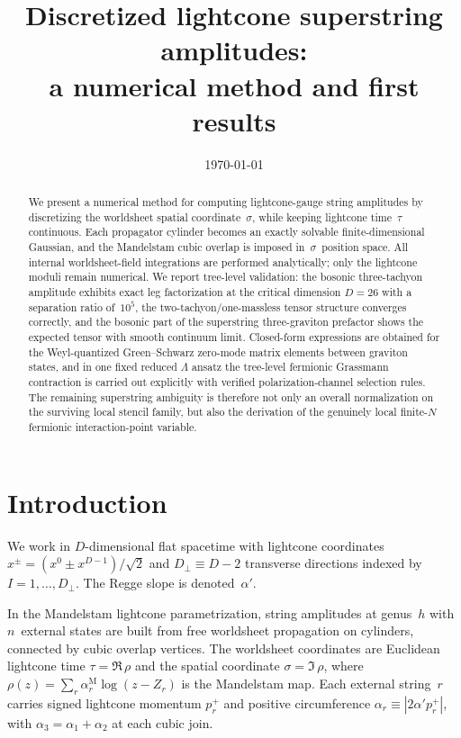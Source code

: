 \documentclass[11pt]{article}
\title{Discretized lightcone superstring amplitudes:\\a numerical method and first results}
\author{}
\date{\today}
\newcommand{\al}{\alpha'}
\newcommand{\perpD}{D_\perp}
\begin{document}
\maketitle

\begin{abstract}
We present a numerical method for computing lightcone-gauge string amplitudes by discretizing the worldsheet spatial coordinate~$\sigma$, while keeping lightcone time~$\tau$ continuous. Each propagator cylinder becomes an exactly solvable finite-dimensional Gaussian, and the Mandelstam cubic overlap is imposed in~$\sigma$~position space. All internal worldsheet-field integrations are performed analytically; only the lightcone moduli remain numerical. We report tree-level validation: the bosonic three-tachyon amplitude exhibits exact leg factorization at the critical dimension $D=26$ with a separation ratio of~$10^5$, the two-tachyon/one-massless tensor structure converges correctly, and the bosonic part of the superstring three-graviton prefactor shows the expected tensor with smooth continuum limit. Closed-form expressions are obtained for the Weyl-quantized Green--Schwarz zero-mode matrix elements between graviton states, and in one fixed reduced $\Lambda$ ansatz the tree-level fermionic Grassmann contraction is carried out explicitly with verified polarization-channel selection rules. The remaining superstring ambiguity is therefore not only an overall normalization on the surviving local stencil family, but also the derivation of the genuinely local finite-$N$ fermionic interaction-point variable.
\end{abstract}

\tableofcontents

\section{Introduction}

We work in $D$-dimensional flat spacetime with lightcone coordinates $x^\pm = (x^0 \pm x^{D-1})/\sqrt{2}$ and $\perpD \equiv D-2$ transverse directions indexed by $I = 1, \dots, \perpD$. The Regge slope is denoted~$\al$.

In the Mandelstam lightcone parametrization, string amplitudes at genus~$h$ with $n$~external states are built from free worldsheet propagation on cylinders, connected by cubic overlap vertices. The worldsheet coordinates are Euclidean lightcone time $\tau = \Re\,\rho$ and the spatial coordinate $\sigma = \Im\,\rho$, where $\rho(z) = \sum_r \alpha_r^{\mathrm{M}}\log(z - Z_r)$ is the Mandelstam map. Each external string~$r$ carries signed lightcone momentum $p_r^+$ and positive circumference $\alpha_r \equiv |2\al p_r^+|$, with $\alpha_3 = \alpha_1 + \alpha_2$ at each cubic join.
\end{document}
